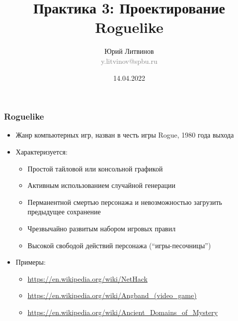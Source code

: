 \documentclass[xetex,mathserif,serif]{beamer}
\title{Практика 3: Проектирование Roguelike}
\author[Юрий Литвинов]{Юрий Литвинов\\\small{\textcolor{gray}{y.litvinov@spbu.ru}}}
\date{14.04.2022}
\begin{document}
    \maketitle

    \begin{frame}
        \frametitle{Roguelike}
        \begin{itemize}
            \item Жанр компьютерных игр, назван в честь игры Rogue, 1980 года выхода
            \item Характеризуется:
            \begin{itemize}
                \item Простой тайловой или консольной графикой
                \item Активным использованием случайной генерации
                \item Перманентной смертью персонажа и невозможностью загрузить предыдущее сохранение
                \item Чрезвычайно развитым набором игровых правил
                \item Высокой свободой действий персонажа (``игры-песочницы'')
            \end{itemize}
            \item Примеры:
            \begin{itemize}
                \item \url{https://en.wikipedia.org/wiki/NetHack}
                \item \url{https://en.wikipedia.org/wiki/Angband_(video_game)}
                \item \url{https://en.wikipedia.org/wiki/Ancient_Domains_of_Mystery}
            \end{itemize}
        \end{itemize}
    \end{frame}
\end{document}
